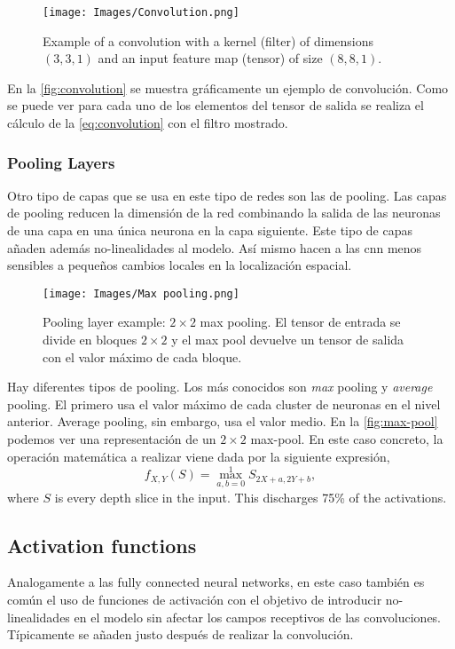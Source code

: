 \begin{figure}[ht]
  \centering
  \texttt{[image: Images/Convolution.png]}
  \caption[Example of a convolution]{Example of a convolution with a kernel
    (filter) of dimensions \((3, 3, 1)\) and an input feature map (tensor) of
    size \((8, 8, 1)\).}
  \label{fig:convolution}
\end{figure}

En la \vref{fig:convolution} se muestra gráficamente un ejemplo de
convolución. Como se puede ver para cada uno de los elementos del tensor de
salida se realiza el cálculo de la \vref{eq:convolution} con el filtro
mostrado.

\subsubsection{Pooling Layers}
Otro tipo de capas que se usa en este tipo de redes son las de pooling. Las
capas de pooling reducen la dimensión de la red combinando la salida de las
neuronas de una capa en una única neurona en la capa siguiente. Este tipo de
capas añaden además no-linealidades al modelo. Así mismo hacen a las \gls{cnn}
menos sensibles a pequeños cambios locales en la localización espacial.

\begin{figure}[ht]
  \centering
  \texttt{[image: Images/Max pooling.png]}
  \caption[Pooling layer example: max pooling]{Pooling layer example:
    \(2 \times 2\) max pooling. El tensor de entrada se divide en bloques
    \(2 \times 2\) y el max pool devuelve un tensor de salida con el valor
    máximo de cada bloque.}
  \label{fig:max-pool}
\end{figure}

Hay diferentes tipos de pooling. Los más conocidos son \emph{max} pooling y
\emph{average} pooling. El primero usa el valor máximo de cada cluster de
neuronas en el nivel anterior. Average pooling, sin embargo, usa el valor
medio. En la \vref{fig:max-pool} podemos ver una representación de un
\(2 \times 2\) max-pool. En este caso concreto, la operación matemática a
realizar viene dada por la siguiente expresión,
\begin{equation}
  f_{X,Y}(S) = \max _{a,b=0}^{1}S_{2X+a,2Y+b},
\end{equation}
where \(S\) is every depth slice in the input. This discharges 75\% of the
activations.

\subsection{Activation functions}
Analogamente a las fully connected neural networks, en este caso también es
común el uso de funciones de activación con el objetivo de introducir
no-linealidades en el modelo sin afectar los campos receptivos de las
convoluciones. Típicamente se añaden justo después de realizar la convolución.

